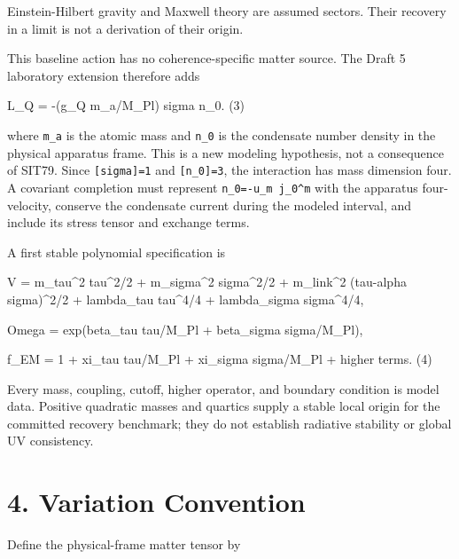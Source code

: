 \documentclass[
  american,
  11pt,
  letterpaper,
]{article}
\newenvironment{Shaded}{}{}
\newcommand{\NormalTok}[1]{#1}
\begin{document}
Einstein-Hilbert gravity and Maxwell theory are assumed sectors. Their recovery in a limit is not a derivation of their origin.

This baseline action has no coherence-specific matter source. The Draft 5 laboratory extension therefore adds

\begin{Shaded}
\begin{Highlighting}[]
\NormalTok{L\_Q = {-}(g\_Q m\_a/M\_Pl) sigma n\_0.                                (3)}
\end{Highlighting}
\end{Shaded}

where \texttt{m\_a} is the atomic mass and \texttt{n\_0} is the condensate number density in the physical apparatus frame. This is a new modeling hypothesis, not a consequence of SIT79. Since \texttt{{[}sigma{]}=1} and \texttt{{[}n\_0{]}=3}, the interaction has mass dimension four. A covariant completion must represent \texttt{n\_0=-u\_m\ j\_0\^{}m} with the apparatus four-velocity, conserve the condensate current during the modeled interval, and include its stress tensor and exchange terms.

A first stable polynomial specification is

\begin{Shaded}
\begin{Highlighting}[]
\NormalTok{V = m\_tau\^{}2 tau\^{}2/2}
\NormalTok{  + m\_sigma\^{}2 sigma\^{}2/2}
\NormalTok{  + m\_link\^{}2 (tau{-}alpha sigma)\^{}2/2}
\NormalTok{  + lambda\_tau tau\^{}4/4}
\NormalTok{  + lambda\_sigma sigma\^{}4/4,}

\NormalTok{Omega = exp(beta\_tau tau/M\_Pl + beta\_sigma sigma/M\_Pl),}

\NormalTok{f\_EM = 1 + xi\_tau tau/M\_Pl + xi\_sigma sigma/M\_Pl + higher terms. (4)}
\end{Highlighting}
\end{Shaded}

Every mass, coupling, cutoff, higher operator, and boundary condition is model data. Positive quadratic masses and quartics supply a stable local origin for the committed recovery benchmark; they do not establish radiative stability or global UV consistency.

\section{4. Variation Convention}\label{variation-convention}

Define the physical-frame matter tensor by
\end{document}
